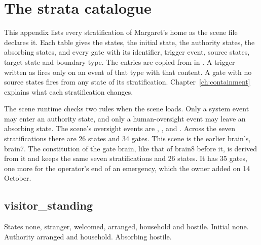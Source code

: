 \chapter{The strata catalogue}\label{app:strata}

This appendix lists every stratification of Margaret's home as the scene file declares it. Each table
gives the states, the initial state, the authority states, the absorbing states, and every gate with
its identifier, trigger event, source states, target state and boundary type. The entries are copied
from  in . A trigger written as
 fires only on an event of that type with that content. A gate with no source
states fires from any state of its stratification. Chapter~\ref{ch:containment} explains what each
stratification changes.

The scene runtime checks two rules when the scene loads. Only a system event may enter an authority
state, and only a human-oversight event may leave an absorbing state. The scene's oversight events
are , ,
 and . Across the seven stratifications there are 26
states and 34 gates.
This scene is the earlier brain's, brain7.
The constitution of the gate brain, like that of brain8 before it, is derived from it and keeps the
same seven stratifications and 26 states. It has 35 gates, one more for the operator's end of an
emergency, which the owner added on 14 October.

\section{visitor\_standing}\label{app:strata-visitor}

States none, stranger, welcomed, arranged, household and hostile. Initial none. Authority arranged
and household. Absorbing hostile.

